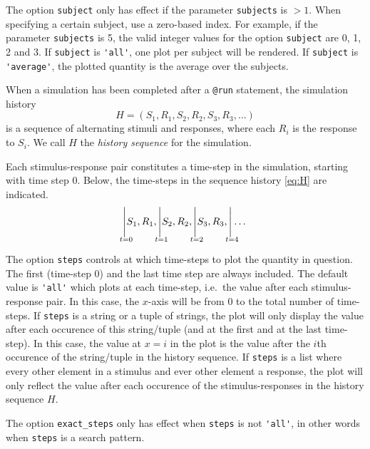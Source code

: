 \documentclass[11pt]{article}
\begin{document}
The option \verb|subject| only has effect if the parameter \verb|subjects| is $>1$. When specifying a certain subject, use a zero-based index. For example, if the parameter \verb|subjects| is 5, the valid integer values for the option \verb|subject| are 0, 1, 2 and 3. If \verb|subject| is \verb|'all'|, one plot per subject will be rendered. If \verb|subject| is \verb|'average'|, the plotted quantity is the average over the subjects.

When a simulation has been completed after a \verb|@run| statement, the simulation history
\begin{equation}
\label{eq:H}
H=(S_1, R_1, S_2, R_2, S_3, R_3, \dotsc)
\end{equation}
is a sequence of alternating stimuli and responses, where each $R_i$ is the response to $S_i$. We call $H$ the \emph{history sequence} for the simulation.

Each stimulus-response pair constitutes a time-step in the simulation, starting with time step 0. Below, the time-steps in the sequence history \eqref{eq:H} are indicated.
\[
\Biggr|_{\mathclap{\substack{\\ \\ t=0}}} S_1, R_1,
\Biggr|_{\mathclap{\substack{\\ \\ t=1}}} S_2, R_2,
\Biggr|_{\mathclap{\substack{\\ \\ t=2}}} S_3, R_3,
\Biggr|_{\mathclap{\substack{\\ \\ t=4}}} \dotsc
\]

The option \verb|steps| controls at which time-steps to plot the quantity in question. The first (time-step 0) and the last time step are always included.
The default value is \verb|'all'| which plots at each time-step, i.e.\ the value after each stimulus-response pair. In this case, the $x$-axis will be from 0 to the total number of time-steps. If \verb|steps| is a string or a tuple of strings, the plot will only display the value after each occurence of this string/tuple (and at the first and at the last time-step). In this case, the value at $x=i$ in the plot is the value after the $i$th occurence of the string/tuple in the history sequence. If \verb|steps| is a list where every other element in a stimulus and ever other element a response, the plot will only reflect the value after each occurence of the stimulus-responses in the history sequence $H$.

The option \verb|exact_steps| only has effect when \verb|steps| is not \verb|'all'|, in other words when \verb|steps| is a search pattern.
\end{document}
